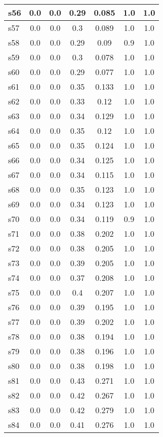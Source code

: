 \documentclass{article}
\begin{document}
\begin{tabular}{|l|c|c|c|c|c|c|}
\hline
s56 &0.0 & 0.0 & 0.29 & 0.085 & 1.0 & 1.0\\
\hline
s57 &0.0 & 0.0 & 0.3 & 0.089 & 1.0 & 1.0\\
\hline
s58 &0.0 & 0.0 & 0.29 & 0.09 & 0.9 & 1.0\\
\hline
s59 &0.0 & 0.0 & 0.3 & 0.078 & 1.0 & 1.0\\
\hline
s60 &0.0 & 0.0 & 0.29 & 0.077 & 1.0 & 1.0\\
\hline
s61 &0.0 & 0.0 & 0.35 & 0.133 & 1.0 & 1.0\\
\hline
s62 &0.0 & 0.0 & 0.33 & 0.12 & 1.0 & 1.0\\
\hline
s63 &0.0 & 0.0 & 0.34 & 0.129 & 1.0 & 1.0\\
\hline
s64 &0.0 & 0.0 & 0.35 & 0.12 & 1.0 & 1.0\\
\hline
s65 &0.0 & 0.0 & 0.35 & 0.124 & 1.0 & 1.0\\
\hline
s66 &0.0 & 0.0 & 0.34 & 0.125 & 1.0 & 1.0\\
\hline
s67 &0.0 & 0.0 & 0.34 & 0.115 & 1.0 & 1.0\\
\hline
s68 &0.0 & 0.0 & 0.35 & 0.123 & 1.0 & 1.0\\
\hline
s69 &0.0 & 0.0 & 0.34 & 0.123 & 1.0 & 1.0\\
\hline
s70 &0.0 & 0.0 & 0.34 & 0.119 & 0.9 & 1.0\\
\hline
s71 &0.0 & 0.0 & 0.38 & 0.202 & 1.0 & 1.0\\
\hline
s72 &0.0 & 0.0 & 0.38 & 0.205 & 1.0 & 1.0\\
\hline
s73 &0.0 & 0.0 & 0.39 & 0.205 & 1.0 & 1.0\\
\hline
s74 &0.0 & 0.0 & 0.37 & 0.208 & 1.0 & 1.0\\
\hline
s75 &0.0 & 0.0 & 0.4 & 0.207 & 1.0 & 1.0\\
\hline
s76 &0.0 & 0.0 & 0.39 & 0.195 & 1.0 & 1.0\\
\hline
s77 &0.0 & 0.0 & 0.39 & 0.202 & 1.0 & 1.0\\
\hline
s78 &0.0 & 0.0 & 0.38 & 0.194 & 1.0 & 1.0\\
\hline
s79 &0.0 & 0.0 & 0.38 & 0.196 & 1.0 & 1.0\\
\hline
s80 &0.0 & 0.0 & 0.38 & 0.198 & 1.0 & 1.0\\
\hline
s81 &0.0 & 0.0 & 0.43 & 0.271 & 1.0 & 1.0\\
\hline
s82 &0.0 & 0.0 & 0.42 & 0.267 & 1.0 & 1.0\\
\hline
s83 &0.0 & 0.0 & 0.42 & 0.279 & 1.0 & 1.0\\
\hline
s84 &0.0 & 0.0 & 0.41 & 0.276 & 1.0 & 1.0\\

\end{tabular}
\end{document}
